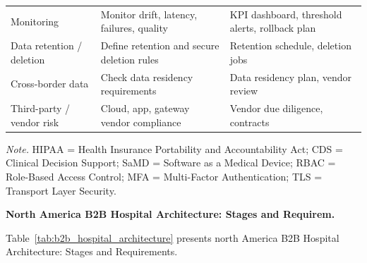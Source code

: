 {\begin{xltabular}{\textwidth}{@{} >{\raggedright\arraybackslash}p{2.2cm} L L @{}}
Monitoring & Monitor drift, latency, failures, quality & KPI dashboard, threshold alerts, rollback plan \\
Data retention / deletion & Define retention and secure deletion rules & Retention schedule, deletion jobs \\
Cross-border data & Check data residency requirements & Data residency plan, vendor review \\
Third-party / vendor risk & Cloud, app, gateway vendor compliance & Vendor due diligence, contracts \\
\end{xltabular}
}%

\noindent\textit{Note.} HIPAA = Health Insurance Portability and Accountability Act; CDS = Clinical Decision Support; SaMD = Software as a Medical Device; RBAC = Role-Based Access Control; MFA = Multi-Factor Authentication; TLS = Transport Layer Security.

\iffalse %
\noindent\textbf{North America B2B Hospital Architecture: Stages and Requirem.}

\noindent Table~\ref{tab:b2b_hospital_architecture} presents north America B2B Hospital Architecture: Stages and Requirements.

